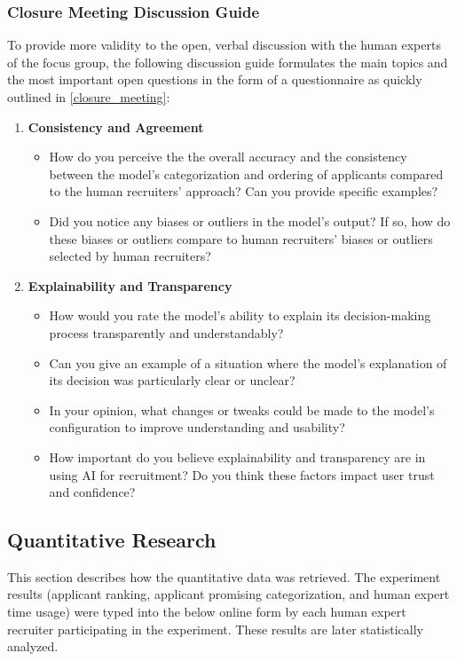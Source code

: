 \documentclass[draft,final]{thesisclass} %
\begin{document}
\subsubsection{Closure Meeting Discussion Guide}
To provide more validity to the open, verbal discussion with the human experts of the focus group, the following discussion guide formulates the main topics and the most important open questions in the form of a questionnaire as quickly outlined in \ref{closure_meeting}:
\begin{enumerate}
    \item \textbf{Consistency and Agreement}
    \begin{itemize}
        \item How do you perceive the the overall accuracy and the consistency between the model's categorization and ordering of applicants compared to the human recruiters' approach? Can you provide specific examples?
        \item Did you notice any biases or outliers in the model's output? If so, how do these biases or outliers compare to human recruiters' biases or outliers selected by human recruiters?
    \end{itemize}
    \item \textbf{Explainability and Transparency}
    \begin{itemize}
        \item How would you rate the model's ability to explain its decision-making process transparently and understandably?
        \item Can you give an example of a situation where the model's explanation of its decision was particularly clear or unclear?
        \item In your opinion, what changes or tweaks could be made to the model's configuration to improve understanding and usability?
        \item How important do you believe explainability and transparency are in using \acs{AI} for recruitment? Do you think these factors impact user trust and confidence?
    \end{itemize}
\end{enumerate}

\subsection{Quantitative Research}
This section describes how the quantitative data was retrieved.
The experiment results (applicant ranking, applicant promising categorization, and human expert time usage) were typed into the below online form by each human expert recruiter participating in the experiment.
These results are later statistically analyzed.
\end{document}
